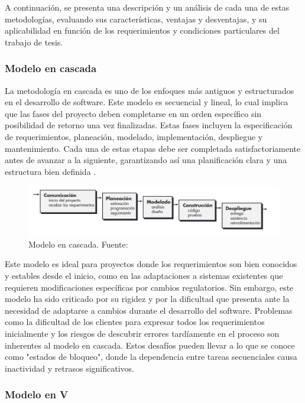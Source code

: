 \documentclass[main.tex]{subfiles}
\begin{document}
A continuación, se presenta una descripción y un análisis de cada una de estas metodologías, evaluando sus características, ventajas y desventajas, y su aplicabilidad en función de los requerimientos y condiciones particulares del trabajo de tesis.


\subsubsection{Modelo en cascada}

La metodología en cascada es uno de los enfoques más antiguos y estructurados en el desarrollo de software. Este modelo es secuencial y lineal, lo cual implica que las fases del proyecto deben completarse en un orden específico sin posibilidad de retorno una vez finalizadas. Estas fases incluyen la especificación de requerimientos, planeación, modelado, implementación, despliegue y mantenimiento. Cada una de estas etapas debe ser completada satisfactoriamente antes de avanzar a la siguiente, garantizando así una planificación clara y una estructura bien definida \cite{pressman2010ingeneria}.

\begin{figure}[h]
    \centering
    \includegraphics[width=\linewidth]{../assets/model-waterfall.png}
    \caption{Modelo en cascada. Fuente: \cite{pressman2010ingeneria}}
\end{figure}


Este modelo es ideal para proyectos donde los requerimientos son bien conocidos y estables desde el inicio, como en las adaptaciones a sistemas existentes que requieren modificaciones específicas por cambios regulatorios. Sin embargo, este modelo ha sido criticado por su rigidez y por la dificultad que presenta ante la necesidad de adaptarse a cambios durante el desarrollo del software. Problemas como la dificultad de los clientes para expresar todos los requerimientos inicialmente y los riesgos de descubrir errores tardíamente en el proceso son inherentes al modelo en cascada. Estos desafíos pueden llevar a lo que se conoce como "estados de bloqueo", donde la dependencia entre tareas secuenciales causa inactividad y retrasos significativos.

\subsubsection{Modelo en V}
\end{document}
